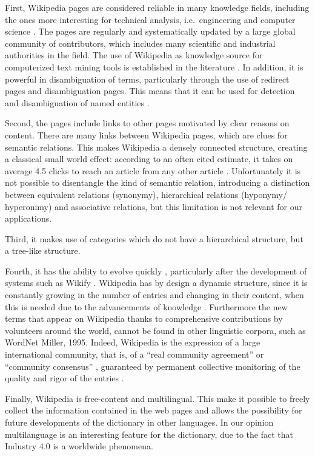 \documentclass[]{book}
\begin{document}
First, Wikipedia pages are considered reliable in many knowledge fields,
including the ones more interesting for technical analysis,
i.e.~engineering and computer science \citep{xu2015improving}. The pages
are regularly and systematically updated by a large global community of
contributors, which includes many scientific and industrial authorities
in the field. The use of Wikipedia as knowledge source for computerized
text mining tools is established in the literature
\citep{ferragina2012fast}. In addition, it is powerful in disambiguation
of terms, particularly through the use of redirect pages and
disambiguation pages. This means that it can be used for detection and
disambiguation of named entities \citep{bunescu2006using}.

Second, the pages include links to other pages motivated by clear
reasons on content. There are many links between Wikipedia pages, which
are clues for semantic relations. This makes Wikipedia a densely
connected structure, creating a classical small world effect: according
to an often cited estimate, it takes on average 4.5 clicks to reach an
article from any other article \citep{dolan2008six}. Unfortunately it is
not possible to disentangle the kind of semantic relation, introducing a
distinction between equivalent relations (synonymy), hierarchical
relations (hyponymy/ hyperonimy) and associative relations, but this
limitation is not relevant for our applications.

Third, it makes use of categories which do not have a hierarchical
structure, but a tree-like structure.

Fourth, it has the ability to evolve quickly \citep{lih2004wikipedia},
particularly after the development of systems such as Wikify
\citep{mihalcea2007wikify, cheng2013relational}. Wikipedia has by design
a dynamic structure, since it is constantly growing in the number of
entries and changing in their content, when this is needed due to the
advancements of knowledge \citep{ponzetto2007knowledge}. Furthermore the
new terms that appear on Wikipedia thanks to comprehensive contributions
by volunteers around the world, cannot be found in other linguistic
corpora, such as WordNet Miller, 1995. Indeed, Wikipedia is the
expression of a large international community, that is, of a ``real
community agreement'' \citep{bizer2009dbpedia} or ``community
consensus'' \citep{hepp2007harvesting}, guaranteed by permanent
collective monitoring of the quality and rigor of the entries
\citep{bryant2005becoming}.

Finally, Wikipedia is free-content and multilingual. This make it
possible to freely collect the information contained in the web pages
and allows the possibility for future developments of the dictionary in
other languages. In our opinion multilanguage is an interesting feature
for the dictionary, due to the fact that Industry 4.0 is a worldwide
phenomena.
\end{document}
